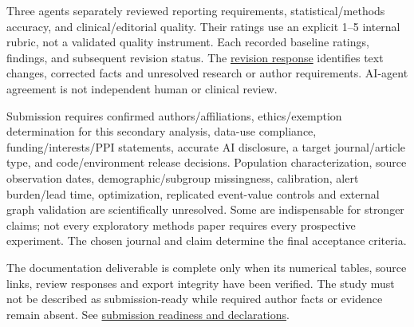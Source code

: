 \documentclass[11pt,a4paper]{article}
\begin{document}
Three agents separately reviewed reporting requirements, statistical/methods accuracy, and clinical/editorial quality. Their ratings use an explicit 1--5 internal rubric, not a validated quality instrument. Each recorded baseline ratings, findings, and subsequent revision status. The \href{../manuscript/revision_response_2026_11_08.md}{revision response} identifies text changes, corrected facts and unresolved research or author requirements. AI-agent agreement is not independent human or clinical review.

Submission requires confirmed authors/affiliations, ethics/exemption determination for this secondary analysis, data-use compliance, funding/interests/PPI statements, accurate AI disclosure, a target journal/article type, and code/environment release decisions. Population characterization, source observation dates, demographic/subgroup missingness, calibration, alert burden/lead time, optimization, replicated event-value controls and external graph validation are scientifically unresolved. Some are indispensable for stronger claims; not every exploratory methods paper requires every prospective experiment. The chosen journal and claim determine the final acceptance criteria.

The documentation deliverable is complete only when its numerical tables, source links, review responses and export integrity have been verified. The study must not be described as submission-ready while required author facts or evidence remain absent. See \href{../manuscript/submission_readiness_2026_11_08.md}{submission readiness and declarations}.
\end{document}
